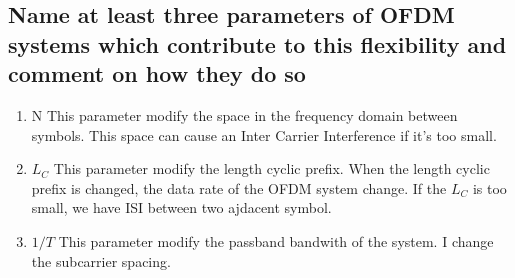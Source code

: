 \documentclass[frenchb, oneside, headings=normal]{scrartcl}
\begin{document}
\subsection{Name at least three parameters of OFDM systems which contribute to this flexibility and comment on how they do so}
\begin{enumerate}
\item N This parameter modify the space in the frequency domain between symbols. This space can cause an Inter Carrier Interference if it's too small.
\item $L_C$ This parameter modify the length cyclic prefix. When the length cyclic prefix is changed, the data rate of the OFDM system change. If the $L_C$ is too small, we have ISI between two ajdacent symbol.
\item $1/T$ This parameter modify the passband bandwith of the system. I change the subcarrier spacing.
\end{enumerate}
\end{document}
